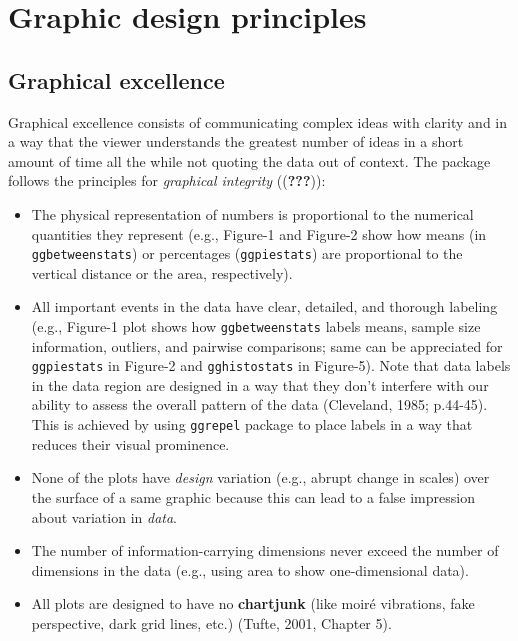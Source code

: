 \documentclass[]{article}
\begin{document}
\hypertarget{graphic-design-principles}{%
\section{Graphic design principles}\label{graphic-design-principles}}

\hypertarget{graphical-excellence}{%
\subsection{Graphical excellence}\label{graphical-excellence}}

Graphical excellence consists of communicating complex ideas with
clarity and in a way that the viewer understands the greatest number of
ideas in a short amount of time all the while not quoting the data out
of context. The package follows the principles for \emph{graphical
integrity} (({\textbf{???}})):

\begin{itemize}
\item
  The physical representation of numbers is proportional to the
  numerical quantities they represent (e.g., Figure-1 and Figure-2 show
  how means (in \texttt{ggbetweenstats}) or percentages
  (\texttt{ggpiestats}) are proportional to the vertical distance or the
  area, respectively).
\item
  All important events in the data have clear, detailed, and thorough
  labeling (e.g., Figure-1 plot shows how \texttt{ggbetweenstats} labels
  means, sample size information, outliers, and pairwise comparisons;
  same can be appreciated for \texttt{ggpiestats} in Figure-2 and
  \texttt{gghistostats} in Figure-5). Note that data labels in the data
  region are designed in a way that they don't interfere with our
  ability to assess the overall pattern of the data (Cleveland, 1985;
  p.44-45). This is achieved by using \texttt{ggrepel} package to place
  labels in a way that reduces their visual prominence.
\item
  None of the plots have \emph{design} variation (e.g., abrupt change in
  scales) over the surface of a same graphic because this can lead to a
  false impression about variation in \emph{data}.
\item
  The number of information-carrying dimensions never exceed the number
  of dimensions in the data (e.g., using area to show one-dimensional
  data).
\item
  All plots are designed to have no \textbf{chartjunk} (like moiré
  vibrations, fake perspective, dark grid lines, etc.) (Tufte, 2001,
  Chapter 5).
\end{itemize}
\end{document}
